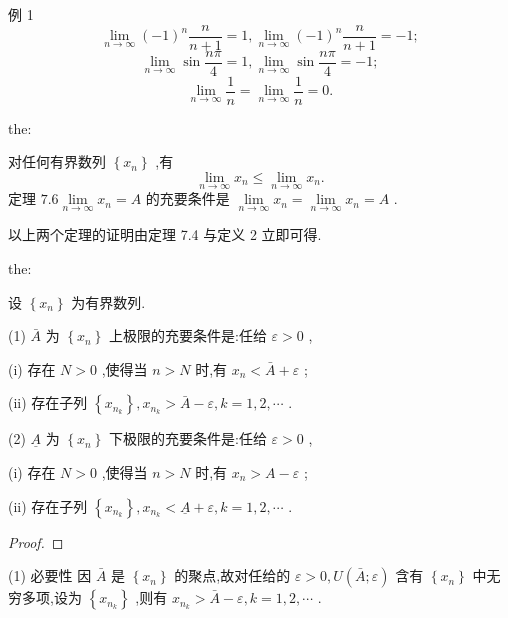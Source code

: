 例 1
\[
\mathop{\lim }\limits_{{n \rightarrow  \infty }}{\left( -1\right) }^{n}\frac{n}{n + 1} = 1,\mathop{\lim }\limits_{{n \rightarrow  \infty }}{\left( -1\right) }^{n}\frac{n}{n + 1} =  - 1;
\]
\[
\mathop{\lim }\limits_{{n \rightarrow  \infty }}\sin \frac{n\pi }{4} = 1,\mathop{\lim }\limits_{{n \rightarrow  \infty }}\sin \frac{n\pi }{4} =  - 1;
\]
\[
\mathop{\lim }\limits_{{n \rightarrow  \infty }}\frac{1}{n} = \mathop{\lim }\limits_{{n \rightarrow  \infty }}\frac{1}{n} = 0.
\]
\begin{theorem}{}{the:}

\end{theorem}
 对任何有界数列 \(\left\{  {x}_{n}\right\}\) ,有
\[
\mathop{\lim }\limits_{{n \rightarrow  \infty }}{x}_{n} \leq  \mathop{\lim }\limits_{{n \rightarrow  \infty }}{x}_{n}.
\]
定理 \({7.6}\mathop{\lim }\limits_{{n \rightarrow  \infty }}{x}_{n} = A\) 的充要条件是 \(\mathop{\lim }\limits_{{n \rightarrow  \infty }}{x}_{n} = \mathop{\lim }\limits_{{n \rightarrow  \infty }}{x}_{n} = A\) .

以上两个定理的证明由定理 7.4 与定义 2 立即可得.

\begin{theorem}{}{the:}

\end{theorem}
 设 \(\left\{  {x}_{n}\right\}\) 为有界数列.

(1) \(\bar{A}\) 为 \(\left\{  {x}_{n}\right\}\) 上极限的充要条件是:任给 \(\varepsilon  > 0\) ,

(i) 存在 \(N > 0\) ,使得当 \(n > N\) 时,有 \({x}_{n} < \bar{A} + \varepsilon\) ;

(ii) 存在子列 \(\left\{  {x}_{{n}_{k}}\right\}  ,{x}_{{n}_{k}} > \bar{A} - \varepsilon ,k = 1,2,\cdots\) .

(2) \(\underline{A}\) 为 \(\left\{  {x}_{n}\right\}\) 下极限的充要条件是:任给 \(\varepsilon  > 0\) ,

(i) 存在 \(N > 0\) ,使得当 \(n > N\) 时,有 \({x}_{n} > A - \varepsilon\) ;

(ii) 存在子列 \(\left\{  {x}_{{n}_{k}}\right\}  ,{x}_{{n}_{k}} < \underline{A} + \varepsilon ,k = 1,2,\cdots\) .

\begin{proof}

\end{proof}
(1) 必要性 因 \(\bar{A}\) 是 \(\left\{  {x}_{n}\right\}\) 的聚点,故对任给的 \(\varepsilon  > 0,U\left( {\bar{A};\varepsilon }\right)\) 含有 \(\left\{  {x}_{n}\right\}\) 中无穷多项,设为 \(\left\{  {x}_{{n}_{k}}\right\}\) ,则有 \({x}_{{n}_{k}} > \bar{A} - \varepsilon ,k = 1,2,\cdots\) .

